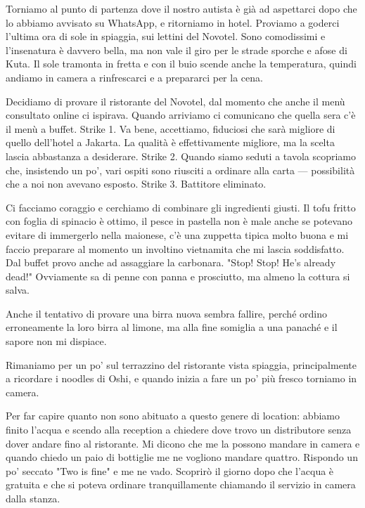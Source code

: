 Torniamo al punto di partenza dove il nostro autista è già ad aspettarci dopo che lo abbiamo avvisato su WhatsApp, e ritorniamo in hotel. Proviamo a goderci l'ultima ora di sole in spiaggia, sui lettini del Novotel. Sono comodissimi e l'insenatura è davvero bella, ma non vale il giro per le strade sporche e afose di Kuta. Il sole tramonta in fretta e con il buio scende anche la temperatura, quindi andiamo in camera a rinfrescarci e a prepararci per la cena.

Decidiamo di provare il ristorante del Novotel, dal momento che anche il menù consultato online ci ispirava. Quando arriviamo ci comunicano che quella sera c'è il menù a buffet. Strike 1. Va bene, accettiamo, fiduciosi che sarà migliore di quello dell'hotel a Jakarta. La qualità è effettivamente migliore, ma la scelta lascia abbastanza a desiderare. Strike 2. Quando siamo seduti a tavola scopriamo che, insistendo un po', vari ospiti sono riusciti a ordinare alla carta — possibilità che a noi non avevano esposto. Strike 3. Battitore eliminato.

Ci facciamo coraggio e cerchiamo di combinare gli ingredienti giusti. Il tofu fritto con foglia di spinacio è ottimo, il pesce in pastella non è male anche se potevano evitare di immergerlo nella maionese, c'è una zuppetta tipica molto buona e mi faccio preparare al momento un involtino vietnamita che mi lascia soddisfatto. Dal buffet provo anche ad assaggiare la carbonara. "Stop! Stop! He's already dead!" Ovviamente sa di penne con panna e prosciutto, ma almeno la cottura si salva.

Anche il tentativo di provare una birra nuova sembra fallire, perché ordino erroneamente la loro birra al limone, ma alla fine somiglia a una panaché e il sapore non mi dispiace.

Rimaniamo per un po' sul terrazzino del ristorante vista spiaggia, principalmente a ricordare i noodles di Oshi, e quando inizia a fare un po' più fresco torniamo in camera.

Per far capire quanto non sono abituato a questo genere di location: abbiamo finito l'acqua e scendo alla reception a chiedere dove trovo un distributore senza dover andare fino al ristorante. Mi dicono che me la possono mandare in camera e quando chiedo un paio di bottiglie me ne vogliono mandare quattro. Rispondo un po' seccato "Two is fine" e me ne vado. Scoprirò il giorno dopo che l'acqua è gratuita e che si poteva ordinare tranquillamente chiamando il servizio in camera dalla stanza.

\pagestyle{empty} %

